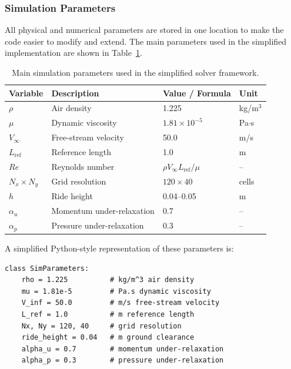 \documentclass[12pt,a4paper]{article}
\begin{document}
\subsubsection{Simulation Parameters}

All physical and numerical parameters are stored in one location to make the code easier
to modify and extend. The main parameters used in the simplified implementation are
shown in Table~\ref{tab:simulation_parameters}.

\begin{table}[H]
\centering
\caption{Main simulation parameters used in the simplified solver framework.}
\label{tab:simulation_parameters}
\begin{tabular}{p{3cm}p{5.5cm}p{3cm}p{2cm}}
\toprule
\textbf{Variable} & \textbf{Description} & \textbf{Value / Formula} & \textbf{Unit} \\
\midrule
$\rho$ & Air density & 1.225 & kg/m$^3$ \\
$\mu$ & Dynamic viscosity & $1.81\times10^{-5}$ & Pa$\cdot$s \\
$V_{\infty}$ & Free-stream velocity & 50.0 & m/s \\
$L_{\text{ref}}$ & Reference length & 1.0 & m \\
$Re$ & Reynolds number & $\rho V_{\infty}L_{\text{ref}}/\mu$ & -- \\
$N_x \times N_y$ & Grid resolution & $120 \times 40$ & cells \\
$h$ & Ride height & 0.04--0.05 & m \\
$\alpha_u$ & Momentum under-relaxation & 0.7 & -- \\
$\alpha_p$ & Pressure under-relaxation & 0.3 & -- \\
\bottomrule
\end{tabular}
\end{table}

A simplified Python-style representation of these parameters is:

\begin{lstlisting}[style=cleanPython, caption={Simulation parameters for the simplified CFD framework.}]
class SimParameters:
    rho = 1.225          # kg/m^3 air density
    mu = 1.81e-5         # Pa.s dynamic viscosity
    V_inf = 50.0         # m/s free-stream velocity
    L_ref = 1.0          # m reference length
    Nx, Ny = 120, 40     # grid resolution
    ride_height = 0.04   # m ground clearance
    alpha_u = 0.7        # momentum under-relaxation
    alpha_p = 0.3        # pressure under-relaxation
\end{lstlisting}
\end{document}
